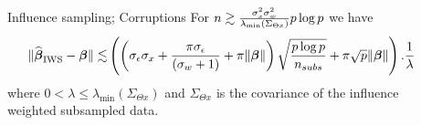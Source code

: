 \documentclass[final,t,english,professionalfonts, xcolor=dvipsnames]{beamer}
\begin{document}
\begin{frame}{}
{\begin{minipage}[c]{0.96\linewidth}
\begin{columns}[t]
\begin{column}{.33\linewidth}
\end{column}

\begin{column}{.33\linewidth}

\begin{exampleblock}{Influence sampling; Corruptions}
For $n\gtrsim \frac{\sigma_x^2\sigma_w^2}{\lambda_{\min}(\Sigma_{\Theta x})}p\log p$ we have
\begin{align*}
\Vert {\widehat{\boldsymbol{\beta}}_{{\text{IWS}}}- \boldsymbol{\beta}} \Vert  \lesssim &  \left( { \left( {\sigma_\epsilon \sigma_x
+  \frac{\pi \sigma_\epsilon}{(\sigma_w+1)}
+  \pi \Vert {\boldsymbol{\beta}} \Vert } \right)\sqrt{\frac{p \log p}{n_{subs}}}
+ \pi \sqrt{p} \Vert {\boldsymbol{\beta}} \Vert
} \right)
. \frac{1}{\lambda}
 \end{align*}
where $0 < \lambda \leq \lambda_{\min}(\Sigma_{\Theta x})$ and $\Sigma_{\Theta x}$ is the covariance of the influence weighted subsampled data.
\end{exampleblock}



\end{column}
\end{columns}
\end{minipage}}
\end{frame}
\end{document}

